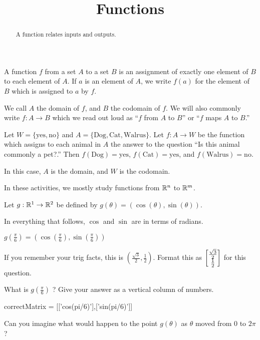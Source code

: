 \documentclass{ximera}
\title{Functions}
\begin{document}
\begin{abstract}
  A function relates inputs and outputs.
\end{abstract}
\maketitle


\begin{definition}
  A function $f$ from a set $A$ to a set $B$ is an assignment of
  exactly one element of $B$ to each element of $A$.  If $a$ is an
  element of $A$, we write $f(a)$ for the element of $B$ which is
  assigned to $a$ by $f$.
\end{definition}

We call $A$ the domain of $f$, and $B$ the codomain of $f$.  We will
also commonly write $f:A \to B$ which we read out loud as ``$f$ from
$A$ to $B$'' or ``$f$ maps $A$ to $B$.''

\begin{example}
  Let $W =\{ \text{yes},\text{no}\}$ and $A = \{ \text{Dog},
  \text{Cat}, \text{Walrus}\}$.  Let $f:A \to W$ be the function which
  assigns to each animal in $A$ the answer to the question ``Is this
  animal commonly a pet?.''  Then $f(\text{Dog}) = \text{yes}$,
  $f(\text{Cat}) = \text{yes}$, and $f(\text{Walrus}) =
  \text{no}$.

  In this case, $A$ is the domain, and $W$ is the codomain.
\end{example}

In these activities, we mostly study functions from $\mathbb R^n$ to $\mathbb R^m$.

\begin{question}
  Let $g:\mathbb R^1 \to \mathbb R^2$ be defined by $g(\theta) = (\cos(\theta),\sin(\theta))$.
  \begin{solution}
    \begin{hint}
      \begin{warning}
        In everything that follows, $\cos$ and $\sin$ are in terms of radians.
      \end{warning}
    \end{hint}
    \begin{hint}
      $g(\frac{\pi}{6}) = (\cos(\frac{\pi}{6}),\sin(\frac{\pi}{6}))$
    \end{hint}
    \begin{hint}
      If you remember your trig facts, this is
      $(\frac{\sqrt{3}}{2},\frac{1}{2})$.  Format this as
      $\begin{bmatrix}\frac{\sqrt{3}}{2} \\ \frac{1}{2}\end{bmatrix}$ for
      this question.
    \end{hint}
    What is $g(\frac{\pi}{6})$ ?  Give your answer as a vertical column of numbers.
    \begin{matrix-answer}
      correctMatrix = [['cos(pi/6)'],['sin(pi/6)']]
    \end{matrix-answer}
  \end{solution}
  
  Can you imagine what would happen to the point $g(\theta)$ as $\theta$ moved from $0$ to $2\pi$?
\end{question}
\end{document}
